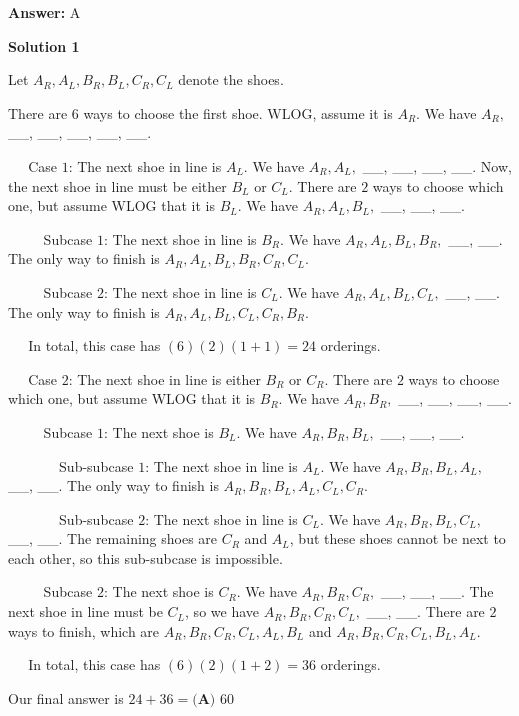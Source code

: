 \begin{enumerate}
 \textbf{Answer: }A



\textbf{Solution 1}

Let $A_R, A_L, B_R, B_L, C_R, C_L$ denote the shoes.

 
There are $6$ ways to choose the first shoe. WLOG, assume it is $A_R$. We have $A_R,$ \_\_, \_\_, \_\_, \_\_, \_\_.

 
$~~~~~$ Case $1$: The next shoe in line is $A_L$. We have $A_R, A_L,$ \_\_, \_\_, \_\_, \_\_. Now, the next shoe in line must be either $B_L$ or $C_L$. There are $2$ ways to choose which one, but assume WLOG that it is $B_L$. We have $A_R, A_L, B_L,$ \_\_, \_\_, \_\_.

 
$~~~~~ ~~~~~$ Subcase $1$: The next shoe in line is $B_R$. We have $A_R, A_L, B_L, B_R,$ \_\_, \_\_. The only way to finish is $A_R, A_L, B_L, B_R, C_R, C_L$.

 
$~~~~~ ~~~~~$ Subcase $2$: The next shoe in line is $C_L$. We have $A_R, A_L, B_L, C_L,$ \_\_, \_\_. The only way to finish is $A_R, A_L, B_L, C_L, C_R, B_R$.

 
$~~~~~$ In total, this case has $(6)(2)(1 + 1) = 24$ orderings.

 
$~~~~~$ Case $2$: The next shoe in line is either $B_R$ or $C_R$. There are $2$ ways to choose which one, but assume WLOG that it is $B_R$. We have $A_R, B_R,$ \_\_, \_\_, \_\_, \_\_.

 
$~~~~~ ~~~~~$ Subcase $1$: The next shoe is $B_L$. We have $A_R, B_R, B_L,$ \_\_, \_\_, \_\_.

 
$~~~~~ ~~~~~ ~~~~~$ Sub-subcase $1$: The next shoe in line is $A_L$. We have $A_R, B_R, B_L, A_L,$ \_\_, \_\_. The only way to finish is $A_R, B_R, B_L, A_L, C_L, C_R$.

 
$~~~~~ ~~~~~ ~~~~~$ Sub-subcase $2$: The next shoe in line is $C_L$. We have $A_R, B_R, B_L, C_L,$ \_\_, \_\_. The remaining shoes are $C_R$ and $A_L$, but these shoes cannot be next to each other, so this sub-subcase is impossible.

 
$~~~~~ ~~~~~$ Subcase $2$: The next shoe is $C_R$. We have $A_R, B_R, C_R,$ \_\_, \_\_, \_\_. The next shoe in line must be $C_L$, so we have $A_R, B_R, C_R, C_L,$ \_\_, \_\_. There are $2$ ways to finish, which are $A_R, B_R, C_R, C_L, A_L, B_L$ and $A_R, B_R, C_R, C_L, B_L, A_L$.

 
$~~~~~$ In total, this case has $(6)(2)(1 + 2) = 36$ orderings.

 
Our final answer is $24 + 36 = \boxed{\textbf{(A) } 60}$





\end{enumerate}

